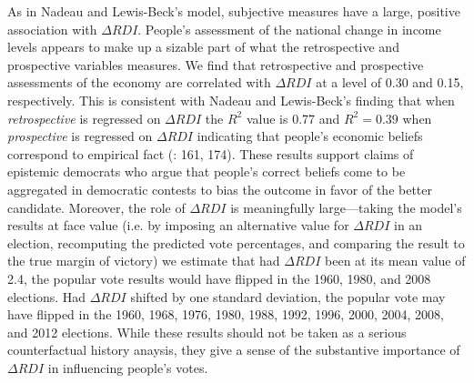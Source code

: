 \documentclass[11pt]{article}
\begin{document}
As in Nadeau and Lewis-Beck's model, subjective measures have a large, positive association with $\Delta RDI$.
 People's assessment of the national change in income levels appears to make up a sizable part of what the retrospective and prospective variables measures.
 We find that retrospective and prospective assessments of the economy are correlated with $\Delta RDI$ at a level of 0.30 and 0.15, respectively.
  This is consistent with Nadeau and Lewis-Beck's finding that when \emph{retrospective} is regressed on $\Delta RDI$ the $R^2$ value is 0.77 and $R^2=0.39$ when \emph{prospective} is regressed on $\Delta RDI$  indicating that people's economic beliefs correspond to empirical fact (\cite{Nadeau:2001tw}: 161, 174).
These results support claims of epistemic democrats who argue that
people's correct beliefs come to be aggregated in democratic contests
to bias the outcome in favor of the better candidate.
Moreover, the role of $\Delta RDI$ is meaningfully large---taking the
model's results at face value (i.e. by imposing an alternative value
for $\Delta RDI$ in an election, recomputing the predicted vote
percentages, and comparing the result to the true margin of victory)
we estimate that had $\Delta RDI$ been at its mean value of 2.4, the
popular vote results would have flipped in the 1960, 1980, and 2008
elections.
Had $\Delta RDI$ shifted by one standard deviation, the popular vote
may have flipped in the 1960, 1968, 1976, 1980, 1988, 1992, 1996,
2000, 2004, 2008, and 2012 elections.
While these results should not be taken as a serious counterfactual
history anaysis, they give a sense of the substantive importance of $\Delta
RDI$ in influencing people's votes.
\end{document}

